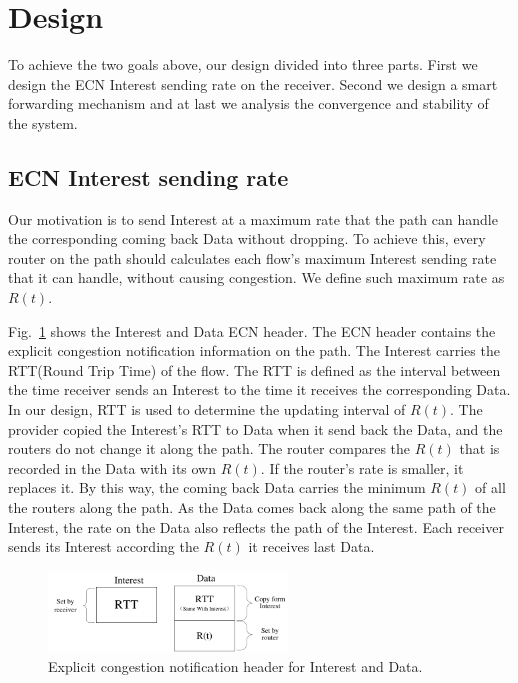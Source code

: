 \section{Design}

\label{sec:design}

To achieve the two goals above, our design divided into three parts. First we design the ECN Interest sending rate on the receiver. Second we design a smart forwarding mechanism and at last we analysis the convergence and stability of the system.

\subsection{ECN Interest sending rate}
Our motivation is to send Interest at a maximum rate that the path can handle the corresponding coming back Data without dropping. To achieve this, every router on the path should calculates each flow's maximum Interest sending rate that it can handle, without causing congestion. We define such maximum rate as $R(t)$.

Fig.~\ref{fig-header} shows the Interest and Data ECN header. The ECN header contains the explicit congestion notification information on the path. The Interest carries the RTT(Round Trip Time) of the flow. The RTT is defined as the interval between the time receiver sends an Interest to the time it receives the corresponding Data. In our design, RTT is used to determine the updating interval of $R(t)$. The provider copied the Interest's RTT to Data when it send back the Data, and the routers do not change it along the path. The router compares the $R(t)$ that is recorded in the Data with its own $R(t)$. If the router's rate is smaller, it replaces it. By this way, the coming back Data carries the minimum $R(t)$ of all the routers along the path. As the Data comes back along the same path of the Interest, the rate on the Data also reflects the path of the Interest. Each receiver sends its Interest according the $R(t)$ it receives last Data.

\begin{figure}[t]
	\centering
	\includegraphics[width=2.5in]{header-ndn.pdf}
	\caption{Explicit congestion notification header for Interest and Data.}
	\label{fig-header}
\end{figure}

